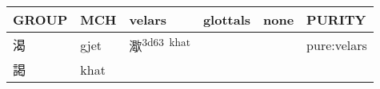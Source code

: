 \documentclass[14pt,a4paper]{scrartcl}
\begin{document}
\begin{longtable}[c]{@{}llllll@{}}
\toprule
\begin{minipage}[b]{0.14\columnwidth}\raggedright\strut
GROUP
\strut\end{minipage} &
\begin{minipage}[b]{0.14\columnwidth}\raggedright\strut
MCH
\strut\end{minipage} &
\begin{minipage}[b]{0.14\columnwidth}\raggedright\strut
velars
\strut\end{minipage} &
\begin{minipage}[b]{0.14\columnwidth}\raggedright\strut
glottals
\strut\end{minipage} &
\begin{minipage}[b]{0.14\columnwidth}\raggedright\strut
none
\strut\end{minipage} &
\begin{minipage}[b]{0.14\columnwidth}\raggedright\strut
PURITY
\strut\end{minipage}\tabularnewline
\midrule
\endhead
\begin{minipage}[t]{0.14\columnwidth}\raggedright\strut
渴
\strut\end{minipage} &
\begin{minipage}[t]{0.14\columnwidth}\raggedright\strut
gjet
\strut\end{minipage} &
\begin{minipage}[t]{0.14\columnwidth}\raggedright\strut
㵣\textsuperscript{3d63~khat}
\strut\end{minipage} &
\begin{minipage}[t]{0.14\columnwidth}\raggedright\strut
\strut\end{minipage} &
\begin{minipage}[t]{0.14\columnwidth}\raggedright\strut
\strut\end{minipage} &
\begin{minipage}[t]{0.14\columnwidth}\raggedright\strut
pure:velars
\strut\end{minipage}\tabularnewline
\begin{minipage}[t]{0.14\columnwidth}\raggedright\strut
謁
\strut\end{minipage} &
\begin{minipage}[t]{0.14\columnwidth}\raggedright\strut
khat
\strut\end{minipage} &
\begin{minipage}[t]{0.14\columnwidth}\raggedright\strut
\strut\end{minipage} &

\end{longtable}
\end{document}
